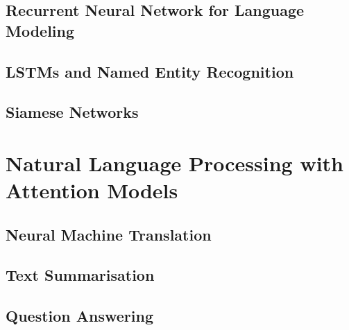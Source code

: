 \subsection{Recurrent Neural Network for Language Modeling}
\subsection{LSTMs and Named Entity Recognition}
\subsection{Siamese Networks}

\section{Natural Language Processing with Attention Models}
\subsection{Neural Machine Translation}
\subsection{Text Summarisation}
\subsection{Question Answering}